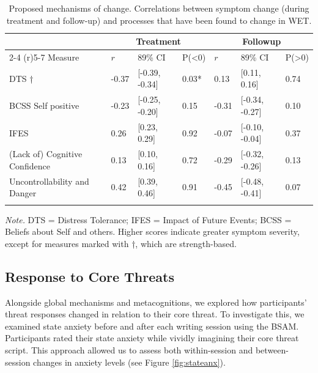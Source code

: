 \documentclass[
  man,floatsintext]{apa7}
\begin{document}
\begin{table}[tbp]

\begin{center}
\begin{threeparttable}

\caption{\label{tab:mechanisms.table}Proposed mechanisms of change. Correlations between symptom change (during treatment and follow-up) and processes that have been found to change in WET.}

\begin{tabular}{lllllll}
\toprule
 & \multicolumn{3}{c}{Treatment} & \multicolumn{3}{c}{Followup} \\
\cmidrule(r){2-4} \cmidrule(r){5-7}
Measure & $r$ & 89\% CI & P(<0) & $r$ & 89\% CI & P(>0)\\
\midrule
DTS † & -0.37 & {}[-0.39, -0.34] & 0.03* & 0.13 & {}[0.11, 0.16] & 0.74\\
BCSS Self positive & -0.23 & {}[-0.25, -0.20] & 0.15 & -0.31 & {}[-0.34, -0.27] & 0.10\\
IFES & 0.26 & {}[0.23, 0.29] & 0.92 & -0.07 & {}[-0.10, -0.04] & 0.37\\
(Lack of) Cognitive Confidence & 0.13 & {}[0.10, 0.16] & 0.72 & -0.29 & {}[-0.32, -0.26] & 0.13\\
Uncontrollability and Danger & 0.42 & {}[0.39, 0.46] & 0.91 & -0.45 & {}[-0.48, -0.41] & 0.07\\
\bottomrule
\addlinespace
\end{tabular}

\begin{tablenotes}[para]
\normalsize{\textit{Note.} DTS = Distress Tolerance; IFES = Impact of Future Events; BCSS = Beliefs about Self and others. Higher scores indicate greater symptom severity, except for measures marked with †, which are strength-based.}
\end{tablenotes}

\end{threeparttable}
\end{center}

\end{table}

\subsection{Response to Core Threats}\label{response-to-core-threats}

Alongside global mechanisms and metacognitions, we explored how participants' threat responses changed in relation to their core threat.
To investigate this, we examined state anxiety before and after each writing session using the BSAM.
Participants rated their state anxiety while vividly imagining their core threat script.
This approach allowed us to assess both within-session and between-session changes in anxiety levels (see Figure \ref{fig:stateanx}).
\end{document}
